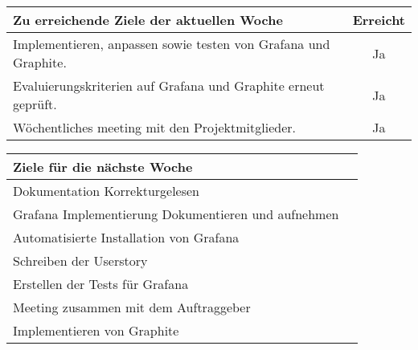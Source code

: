 \begin{tabularx}{\textwidth}{Xc}
    \arrayrulecolor{OliveGreen}
    \toprule
    {\bfseries Zu erreichende Ziele der aktuellen Woche} & {\bfseries Erreicht} \\
    \midrule[2pt]
    Implementieren, anpassen sowie testen von Grafana und Graphite. &Ja      \\
    \rowcolor{OliveGreen!15}
    Evaluierungskriterien auf Grafana und Graphite erneut geprüft.   &Ja      \\
    \rowcolor{White}
    Wöchentliches meeting mit den Projektmitglieder.         &Ja              \\
    \bottomrule[2pt]
\end{tabularx}
%
\vspace{1cm}
%
\begin{tabularx}{\textwidth}{Xc}
    \arrayrulecolor{OliveGreen}
    \toprule
    {\bfseries Ziele für die nächste Woche}        &                         \\
    \midrule[2pt]
    Dokumentation Korrekturgelesen                 &                         \\
    \rowcolor{OliveGreen!15}
    Grafana Implementierung Dokumentieren und aufnehmen   &                  \\
    \rowcolor{White}
    Automatisierte Installation von Grafana        &                         \\
    \rowcolor{OliveGreen!15}
    Schreiben der Userstory                        &                         \\
    \rowcolor{White}
    Erstellen der Tests für Grafana                &                         \\
    \rowcolor{OliveGreen!15}
    Meeting zusammen mit dem Auftraggeber          &                         \\
    \rowcolor{White}
    Implementieren von Graphite                    &                         \\
\end{tabularx}
